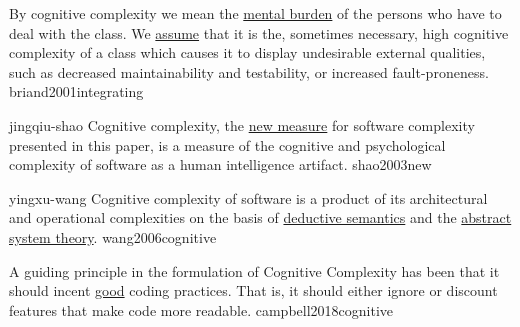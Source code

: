 \documentclass{article}
\begin{document}


  {By cognitive complexity we mean the \ul{mental burden} of the persons who have to deal with the class. We \ul{assume} that it is the, sometimes necessary, high cognitive complexity of a class which causes it to display undesirable external qualities, such as decreased maintainability and testability, or increased fault-proneness.}
  {briand2001integrating}

\qte
  {jingqiu-shao}
  {Cognitive complexity, the \ul{new measure} for software complexity presented in this paper, is a measure of the cognitive and psychological complexity of software as a human intelligence artifact.}
  {shao2003new}


\qte
  {yingxu-wang}
  {Cognitive complexity of software is a product of its architectural and operational complexities on the basis of \ul{deductive semantics} and the \ul{abstract system theory}.}
  {wang2006cognitive}

  {A guiding principle in the formulation of Cognitive Complexity has been that it should incent \ul{good} coding practices. That is, it should either ignore or discount features that make code more readable.}
  {campbell2018cognitive}

\end{document}
